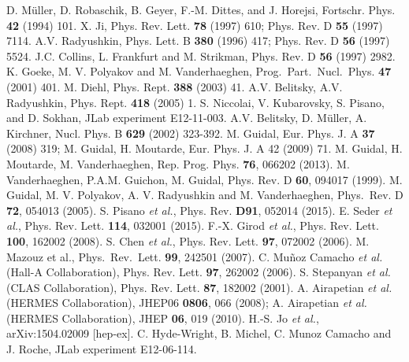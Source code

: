 \documentclass[12pt]{report}
\begin{document}
%
%
%
%
%
%
%
%
%
%
%
%
%


\newpage
\begin{thebibliography}{999}
D. M\"uller, D. Robaschik, B. Geyer, F.-M. Dittes, and J. Horejsi, Fortschr. Phys. {\bf 42} (1994) 101.
 X. Ji, Phys. Rev. Lett. {\bf 78} (1997) 610;
Phys. Rev. D {\bf 55} (1997) 7114.
 A.V. Radyushkin, Phys. Lett. B {\bf 380} (1996) 417; Phys. Rev. D {\bf 56} (1997) 5524.
 J.C. Collins, L. Frankfurt and M. Strikman, Phys. Rev. D {\bf 56} (1997) 2982.
 K. Goeke, M. V. Polyakov and M. Vanderhaeghen, Prog.\ Part.\ Nucl.\ Phys. {\bf 47} (2001) 401.
 M. Diehl, Phys.  Rept. {\bf 388} (2003) 41.
 A.V. Belitsky, A.V. Radyushkin, Phys. Rept. {\bf 418} (2005) 1.
 S. Niccolai, V. Kubarovsky, S. Pisano, and D. Sokhan, JLab experiment E12-11-003.
 A.V. Belitsky, D. M\"uller, A. Kirchner, Nucl. Phys. B {\bf 629} (2002) 323-392.
 M. Guidal, Eur. Phys. J. A {\bf 37} (2008) 319; M. Guidal, H. Moutarde, Eur. Phys. J. A 42 (2009) 71.
 M. Guidal, H. Moutarde, M. Vanderhaeghen, Rep. Prog. Phys. {\bf 76}, 066202 (2013).
 M. Vanderhaeghen, P.A.M. Guichon, M. Guidal, Phys. Rev. D {\bf 60}, 094017 (1999).
 M. Guidal, M. V. Polyakov, A. V. Radyushkin and 
M. Vanderhaeghen, Phys.\ Rev. D {\bf 72}, 054013 (2005).
 S. Pisano {\it et al.}, Phys. Rev. {\bf D91}, 052014 (2015).
 E. Seder {\it et al.}, Phys. Rev. Lett. {\bf 114}, 032001 (2015).
 F.-X. Girod {\it et al.}, Phys. Rev. Lett. {\bf 100}, 162002 (2008).
 S. Chen {\it et al.}, Phys. Rev. Lett. {\bf 97}, 072002 (2006).
 M. Mazouz et al., Phys.\ Rev.\ Lett. {\bf 99}, 242501 (2007).
 C. Mu\~noz Camacho {\it et al.} (Hall-A Collaboration), Phys. Rev. Lett. {\bf 97}, 262002 (2006).
 S. Stepanyan {\it et al.} (CLAS Collaboration), Phys. Rev. Lett. {\bf 87}, 182002 (2001).
 A. Airapetian {\it et al.} (HERMES Collaboration), JHEP06 {\bf 0806}, 066 (2008); A. Airapetian {\it et al.} (HERMES Collaboration), JHEP {\bf 06}, 019 (2010).
 H.-S. Jo {\it et al.}, arXiv:1504.02009 [hep-ex].
  C. Hyde-Wright, B. Michel, C. Munoz Camacho and J. Roche, JLab experiment E12-06-114.

\end{thebibliography}
\end{document}
